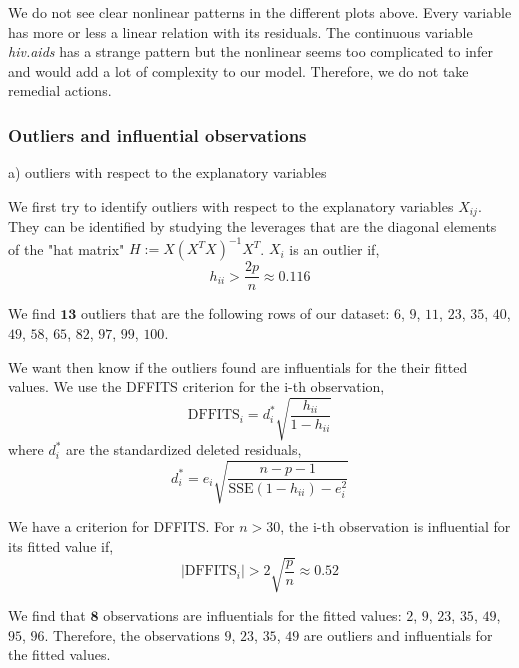 We do not see clear nonlinear patterns in the different plots above. Every variable has more or less a linear relation with its residuals. The continuous variable \textit{hiv.aids} has a strange pattern but the nonlinear seems too complicated to infer and would add a lot of complexity to our model. Therefore, we do not take remedial actions.

\subsubsection{Outliers and influential observations}

a) outliers with respect to the explanatory variables

We first try to identify outliers with respect to the explanatory variables $X_{ij}$. They can be identified by studying the leverages that are the diagonal elements of the "hat matrix" $H := X(X^T X)^{-1}X^T$. $X_i$ is an outlier if,
\begin{equation*}
	h_{ii} > \frac{2p}{n} \approx 0.116
\end{equation*}

We find $\textbf{13}$ outliers that are the following rows of our dataset: $6$, $9$, $11$, $23$, $35$, $40$, $49$, $58$, $65$, $82$, $97$, $99$, $100$.

We want then know if the outliers found are influentials for the their fitted values. We use the DFFITS criterion for the i-th observation,
\begin{equation}
	\text{DFFITS}_i = d_i^{\ast} \sqrt{\frac{h_{ii}}{1 - h_{ii}}}
\end{equation}
where $d_i^{\ast}$ are the standardized deleted residuals,
\begin{equation}
	d_i^{\ast} = e_i \sqrt{\frac{n - p - 1}{\text{SSE}(1 - h_{ii}) - e_i^2}} 
\end{equation}

We have a criterion for DFFITS. For $n > 30$, the i-th observation is influential for its fitted value if, 
\begin{equation}
	|\text{DFFITS}_i| > 2 \sqrt{\frac{p}{n}} \approx 0.52
\end{equation}

We find that $\textbf{8}$ observations are influentials for the fitted values: $2$, $9$, $23$, $35$, $49$, $95$, $96$. Therefore, the observations $9$, $23$, $35$, $49$ are outliers and influentials for the fitted values.

